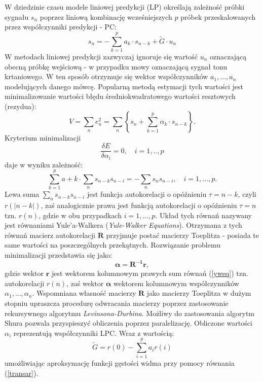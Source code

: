 W dziedzinie czasu modele liniowej predykcji (LP) określają zależność próbki sygnału $s_n$ poprzez liniową kombinację wcześniejszych $p$ próbek przeskalowanych przez współczynniki predykcji - PC:
\begin{equation}
  s_n = - \sum_{k=1}^{p}a_k\cdot s_{n-k}+\tilde{G}\cdot u_n
\end{equation}
W metodach liniowej predykcji zazwyczaj ignoruje się wartość $u_n$ oznaczającą obecną próbkę wejściową - w przypadku mowy oznaczającą sygnał tonu krtaniowego. W ten sposób otrzymuje się wektor współczynników $a_1,...,a_n$ modelujących danego mówcę. Popularną metodą estymacji tych wartości jest minimalizowanie wartości błędu średniokwadratowego wartości resztowych (rezydua):
\begin{equation}
  V = \sum_{n} e_n^2 = \sum_n \left\{ s_n + \sum_{k=1}^p \alpha_k \cdot s_{n-k} \right\}.
\end{equation}
Kryterium minimalizacji
\begin{equation}
  \frac{\delta E}{\delta \alpha_i} = 0, \quad i=1,..,p
\end{equation}
daje w wyniku zależność:
\begin{equation}
  \label{yweq}
  \sum_{k=1}^{p} a+k \cdot \sum_n s_{n-k} s_{n-i} = - \sum_n s_n s_{n-i}, \quad  i=1,...,p.
\end{equation}
Lewa suma $ \sum_n s_{n-k} s_{n-i} $ jest funkcja autokorelacji o opóźnieniu $ \tau = n-k $, czyli $ r(|n-k|) $, zaś analogicznie prawa jest funkcją autokorelacji o opóźnieniu $ \tau = n $ tzn. $ r(n)$, gdzie w obu przypadkach $i=1,...,p$.
Układ tych równań nazywany jest równaniami Yule'a-Walkera (\textit{Yule-Walker Equations}). Otrzymana z tych równań macierz autokorelacji $ \bm{R} $ przyjmuje postać macierzy Toeplitza - posiada te same wartości na poszczególnych przekątnych. Rozwiązanie problemu minimalizacji przedstawia się jako:
\begin{equation}
  \bm{\alpha} = \bm{R^{-1}} \bm{r},
\end{equation}
gdzie wektor $ \bm{r}$ jest wektorem kolumnowym prawych sum równań (\ref{yweq}) tzn. autokorelacji $ r(n)$, zaś wektor $ \bm{\alpha} $ wektorem kolumnowym współczynników $\alpha_1,...,\alpha_n$. Wspomniana własność macierzy $\bm{R}$ jako macierzy Toeplitza w dużym stopniu upraszcza procedurę odwracania macierzy poprzez zastosowanie rekursywnego algorytmu \textit{Levinsona-Durbina}. Możliwy do zastosowania algorytm Shura pozwala przyspieszyć obliczenia poprzez paralelizację. Obliczone wartości $\alpha_i$ reprezentują współczynniki LPC. Wraz z wartością:
\begin{equation}
  \tilde{G} = r(0) - \sum_{i=1}^{p} a_i r(i)
\end{equation}
umożliwiając aproksymację funkcji gęstości widma przy pomocy równania (\ref{transar}).

